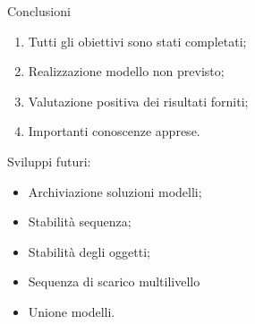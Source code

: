 \documentclass{beamer}
\begin{document}
\begin{frame}{Conclusioni}
	\begin{enumerate}
		\item Tutti gli obiettivi sono stati completati;
		\item Realizzazione modello non previsto;
		\item Valutazione positiva dei risultati forniti;
		\item Importanti conoscenze apprese.
	\end{enumerate}
	
	\vspace{.5em}
	Sviluppi futuri:
	\begin{itemize}
		\item Archiviazione soluzioni modelli;
		\item Stabilit\`a sequenza;
		\item Stabilit\`a degli oggetti;
		\item Sequenza di scarico multilivello
		\item Unione modelli.
	\end{itemize}
\end{frame}
\end{document}
